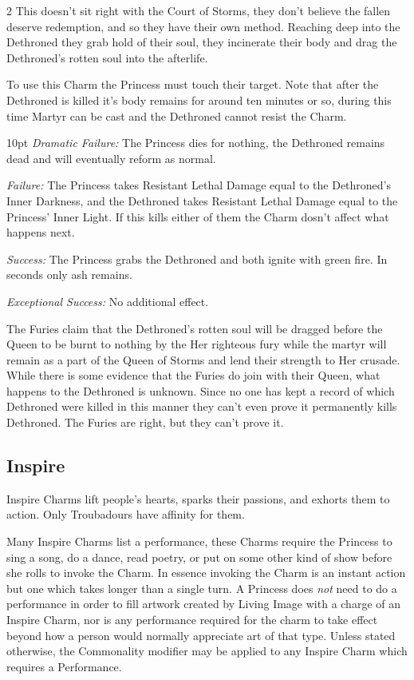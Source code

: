 \begin{multicols}{2}
This doesn’t sit right with the Court of Storms, they don't believe the fallen deserve redemption, and so they have their own method. Reaching deep into the Dethroned they grab hold of their soul, they incinerate their body and drag the Dethroned's rotten soul into the afterlife.

To use this Charm the Princess must touch their target. Note that after the Dethroned is killed it's body remains for around ten minutes or so, during this time Martyr can be cast and the Dethroned cannot resist the Charm. 

\begin{myindentpar}{10pt} \emph{Dramatic Failure:} The Princess dies for nothing, the Dethroned remains dead and will eventually reform as normal. 

    \emph{Failure:} The Princess takes Resistant Lethal Damage equal to the Dethroned's Inner Darkness, and the Dethroned takes Resistant Lethal Damage equal to the Princess' Inner Light. If this kills either of them the Charm dosn't affect what happens next. 

    \emph{Success:} The Princess grabs the Dethroned and both ignite with green fire. In seconds only ash remains. 

    \emph{Exceptional Success:} No additional effect.\end{myindentpar} 

The Furies claim that the Dethroned's rotten soul will be dragged before the Queen to be burnt to nothing by the Her righteous fury while the martyr will remain as a part of the Queen of Storms and lend their strength to Her crusade. While there is some evidence that the Furies do join with their Queen, what happens to the Dethroned is unknown. Since no one has kept a record of which Dethroned were killed in this manner they can't even prove it permanently kills Dethroned. The Furies are right, but they can't prove it. 

\subsection*{Inspire}
\label{subsec:Inspire}
Inspire Charms lift people's hearts, sparks their passions, and exhorts them to action. Only Troubadours have affinity for them.

Many Inspire Charms list a performance, these Charms require the Princess to sing a song, do a dance, read poetry, or put on some other kind of show before she rolls to invoke the Charm. In essence invoking the Charm is an instant action but one which takes longer than a single turn. A Princess does \textit{not} need to do a performance in order to fill artwork created by Living Image with a charge of an Inspire Charm, nor is any performance required for the charm to take effect beyond how a person would normally appreciate art of that type. Unless stated otherwise, the Commonality modifier may be applied to any Inspire Charm which requires a Performance.


\end{multicols}
